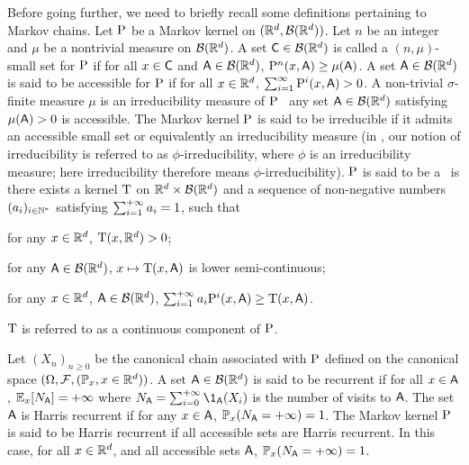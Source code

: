 Before going further, we need to briefly recall some definitions pertaining to Markov chains.
Let $\mathrm{P}$ be a Markov kernel on $(\mathbb{R}^d,\mathcal{B}(\mathbb{R}^d))$. Let $n$ be an integer and $\mu$
be a nontrivial measure on $\mathcal{B}(\mathbb{R}^d)$. A
set $\mathsf{C} \in \mathcal{B}(\mathbb{R}^d)$ is called a $(n,\mu)$-small set for $\mathrm{P}$ if
for all $x \in \mathsf{C}$ and $\mathsf{A} \in \mathcal{B}(\mathbb{R}^d)$, $\mathrm{P}^n(x, \mathsf{A}) \geq \mu(\mathsf{A})$.
A set $\mathsf{A} \in \mathcal{B}(\mathbb{R}^d)$ is said to be accessible for $\mathrm{P}$
  if for all $x \in \mathbb{R}^d$, $\sum_{i=1}^\infty \mathrm{P}^i(x,\mathsf{A}) > 0$.
  A non-trivial $\sigma$-finite measure $\mu$ is an irreducibility
  measure of $\mathrm{P}$ \iff\ any set $\mathsf{A} \in \mathcal{B}(\mathbb{R}^d)$
  satisfying $\mu(\mathsf{A}) >0$ is accessible.  The Markov kernel $\mathrm{P}$ is said to be
  irreducible if it admits an accessible small set or equivalently an
  irreducibility measure (in \cite{meyn:tweedie:2009}, our notion of irreducibility  is referred to as $\phi$-irreducibility, where $\phi$ is an irreducibility measure; here irreducibility therefore means $\phi$-irreducibility). $\mathrm{P}$ is said to be a \Tkernel~is there exists a kernel $\mathrm{T}$ on $\mathbb{R}^d \times \mathcal{B}(\mathbb{R}^d)$ and a sequence of non-negative numbers $(a_i)_{i \in \mathbb{N}^{*}}$ satisfying $\sum_{i=1}^{+\infty} a_i =1$, such that
  \begin{enumerate*}[label=(\roman*)]
  \item for any $x \in \mathbb{R}^d$, $\mathrm{T}(x, \mathbb{R}^d) >0$;
  \item for any $\mathsf{A} \in \mathcal{B}(\mathbb{R}^d)$, $x \mapsto \mathrm{T}(x,\mathsf{A})$ is lower semi-continuous;
\item for any $x \in \mathbb{R}^d$, $\mathsf{A} \in \mathcal{B}(\mathbb{R}^d)$, $\sum_{i=1}^{+\infty} a_i \mathrm{P}^i(x,\mathsf{A}) \geq \mathrm{T}(x,\mathsf{A})$.
  \end{enumerate*}
  $\mathrm{T}$ is referred to as a continuous component of $\mathrm{P}$.


  Let $(X_n)_{n \geq 0}$ be the canonical chain associated with $\mathrm{P}$
  defined on the canonical space $(\Omega,\mathcal{F},(\mathbb{P}_x, x \in \mathbb{R}^d))$. A
  set $\mathsf{A} \in \mathcal{B}(\mathbb{R}^d)$ is said to be recurrent if for all $x \in \mathsf{A}$, $\mathbb{E}_x[N_{\mathsf{A}}]= +\infty$ where $N_\msa = \sum_{i=0}^{\plusinfty} \1_{\msa}(X_i)$ is the number of visits to $\mathsf{A}$. The set $\mathsf{A}$ is Harris recurrent  if for any $x \in \mathsf{A}$, $\mathbb{P}_x(N_{\mathsf{A}} = +\infty) = 1$. The Markov kernel $\mathrm{P}$ is said to be Harris
  recurrent if all accessible sets are Harris recurrent. In this case, for all $x \in \mathbb{R}^d$, and all accessible sets $\mathsf{A}$, $\mathbb{P}_x(N_{\mathsf{A}} = +\infty)=1$.

